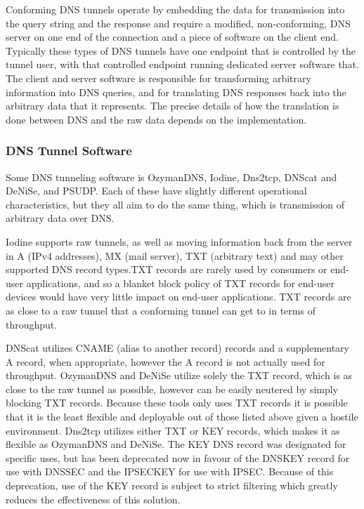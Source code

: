 \documentclass[12pt]{report}
\theoremstyle{remark}
\theoremstyle{definition}
\theoremstyle{definition}
\theoremstyle{definition}
\begin{document}
Conforming DNS tunnels operate by embedding the data for transmission into the
query string and the response and require a modified, non-conforming, DNS server
on one end of the connection and a piece of software on the client end.
Typically these types of DNS tunnels have one endpoint that is controlled by the
tunnel user, with that controlled endpoint running dedicated server software
that. The client and server software is responsible for transforming arbitrary
information into DNS queries, and for translating DNS responses back into the
arbitrary data that it represents. The precise details of how the translation is
done between DNS and the raw data depends on the implementation.

\subsubsection{DNS Tunnel Software}

Some DNS tunneling software is OzymanDNS\cite{ozymandnssrc},
Iodine\cite{iodinesrc}, Dns2tcp\cite{dns2tcpsrc}, DNScat\cite{dnscatsrc} and
DeNiSe\cite{denisesrc}, and PSUDP\cite{psudpsrc}. Each of these have slightly
different operational characteristics, but they all aim to do the same thing,
which is transmission of arbitrary data over DNS.

Iodine supports raw tunnels, as well as moving information back from the server
in A (IPv4 addresses), MX (mail server), TXT (arbitrary text) and may other
supported DNS record types.TXT records are rarely used by consumers or end-user
applications, and so a blanket block policy of TXT records for end-user devices
would have very little impact on end-user applications. TXT records are as close
to a raw tunnel that a conforming tunnel can get to in terms of throughput.

DNScat utilizes CNAME (alias to another record) records and a supplementary A
record, when appropriate, however the A record is not actually used for
throughput. OzymanDNS and DeNiSe utilize solely the TXT record, which is as
close to the raw tunnel as possible, however can be easily neutered by simply
blocking TXT records. Because these tools only uses TXT records it is possible
that it is the least flexible and deployable out of those listed above given a
hostile environment. Dns2tcp utilizes either TXT or KEY records, which makes it
as flexible as OzymanDNS and DeNiSe. The KEY DNS record was designated for
specific uses\cite{rfc2931}, but has been deprecated now\cite{rfc3445} in favour
of the DNSKEY record for use with DNSSEC\cite{rfc3755} and the IPSECKEY for use
with IPSEC\cite{rfc4025}. Because of this deprecation, use of the KEY record is
subject to strict filtering which greatly reduces the effectiveness of this
solution.
\end{document}
